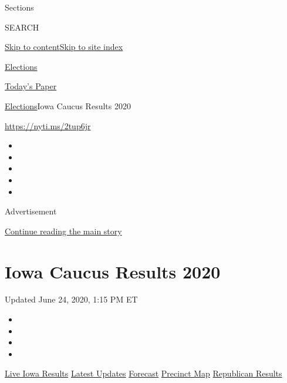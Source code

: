 Sections

SEARCH

\protect\hyperlink{site-content}{Skip to
content}\protect\hyperlink{site-index}{Skip to site index}

\href{https://www.nytimes3xbfgragh.onion/news-event/2020-election}{Elections}

\href{https://myaccount.nytimes3xbfgragh.onion/auth/login?response_type=cookie\&client_id=vi}{}

\href{https://www.nytimes3xbfgragh.onion/section/todayspaper}{Today's
Paper}

\href{/news-event/2020-election}{Elections}\textbar{}Iowa Caucus Results
2020

\url{https://nyti.ms/2tup6jr}

\begin{itemize}
\item
\item
\item
\item
\item
\end{itemize}

Advertisement

\protect\hyperlink{after-top}{Continue reading the main story}

\hypertarget{iowa-caucus-results-2020}{%
\section{Iowa Caucus Results 2020}\label{iowa-caucus-results-2020}}

Updated June 24, 2020, 1:15 PM ET

\begin{itemize}
\item
\item
\item
\item
\end{itemize}

\href{https://www.nytimes3xbfgragh.onion/interactive/2020/02/04/us/elections/results-iowa-caucus.html?action=click\&module=ELEX_results\&pgtype=Interactive\&region=Navigation}{Live
Iowa Results}
\href{https://www.nytimes3xbfgragh.onion/interactive/2020/02/03/us/elections/results-iowa-caucus-live-updates.html?action=click\&module=ELEX_results\&pgtype=Interactive\&region=Navigation}{Latest
Updates}
\href{https://www.nytimes3xbfgragh.onion/interactive/2020/02/03/us/elections/results-iowa-caucus-live-forecast.html?action=click\&module=ELEX_results\&pgtype=Interactive\&region=Navigation}{Forecast}
\href{https://www.nytimes3xbfgragh.onion/interactive/2020/02/03/us/elections/results-iowa-caucus-precinct-map.html?action=click\&module=ELEX_results\&pgtype=Interactive\&region=Navigation}{Precinct
Map}
\href{https://www.nytimes3xbfgragh.onion/interactive/2020/02/03/us/elections/results-iowa-caucus-republicans.html?action=click\&module=ELEX_results\&pgtype=Interactive\&region=Navigation}{Republican
Results}

